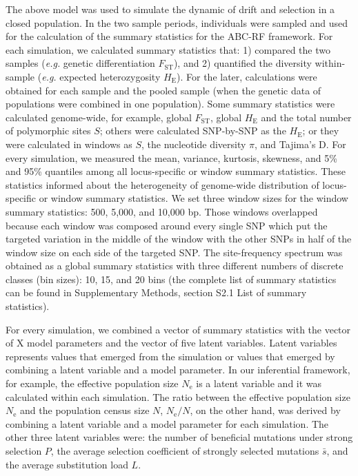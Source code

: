 \documentclass[a4paper, 12pt]{article}
\begin{document}
The above model was used to simulate the dynamic of drift and selection in a closed population. In the two sample periods, individuals were sampled and used for the calculation of the summary statistics for the ABC-RF framework. For each simulation, we calculated summary statistics that: 1) compared the two samples (\textit{e.g.} genetic differentiation $F_{\mathrm{ST}}$), and 2) quantified the diversity within-sample (\textit{e.g.} expected heterozygosity $H_{\mathrm{E}}$). For the later, calculations were obtained for each sample and the pooled sample (when the genetic data of populations were combined in one population). Some summary statistics were calculated genome-wide, for example, global $F_{\mathrm{ST}}$, global $H_{\mathrm{E}}$ and the total number of polymorphic sites $S$; others were calculated SNP-by-SNP as the $H_{\mathrm{E}}$; or they were calculated in windows as $S$, the nucleotide diversity $\pi$, and Tajima's D. For every simulation, we measured the mean, variance, kurtosis, skewness, and 5\% and 95\% quantiles among all locus-specific or window summary statistics. These statistics informed about the heterogeneity of genome-wide distribution of locus-specific or window summary statistics. We set three window sizes for the window summary statistics: 500, 5,000, and 10,000 bp. Those windows overlapped because each window was composed around every single SNP which put the targeted variation in the middle of the window with the other SNPs in half of the window size on each side of the targeted SNP. The site-frequency spectrum was obtained as a global summary statistics with three different numbers of discrete classes (bin sizes): 10, 15, and 20 bins (the complete list of summary statistics can be found in Supplementary Methods, section S2.1 List of summary statistics).

For every simulation, we combined a vector of summary statistics with the vector of X model parameters and the vector of five latent variables. Latent variables represents values that emerged from the simulation or values that emerged by combining a latent variable and a model parameter. In our inferential framework, for example, the effective population size $N_{\mathrm{e}}$ is a latent variable and it was calculated within each simulation. The ratio between the effective population size $N_{\mathrm{e}}$ and the population census size $N$, $N_{\mathrm{e}}/N$, on the other hand, was derived by combining a latent variable and a model parameter for each simulation. The other three latent variables were: the number of beneficial mutations under strong selection $P$, the average selection coefficient of strongly selected mutations $\bar{s}$, and the average substitution load $L$.
\end{document}
